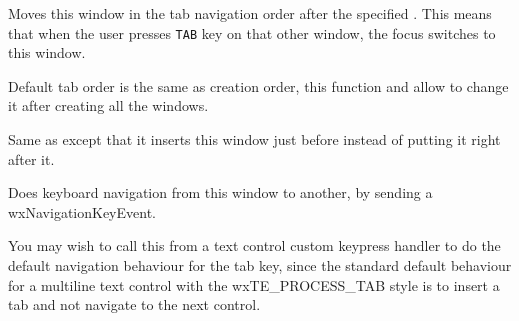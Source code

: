 

\label{wxwindowmoveafterintaborder}


Moves this window in the tab navigation order after the specified .
This means that when the user presses \texttt{TAB} key on that other window,
the focus switches to this window.

Default tab order is the same as creation order, this function and
 allow to change
it after creating all the windows.




\label{wxwindowmovebeforeintaborder}


Same as  except that
it inserts this window just before  instead of putting it right after
it.


\label{wxwindownavigate}


Does keyboard navigation from this window to another, by sending
a wxNavigationKeyEvent.




You may wish to call this from a text control custom keypress handler to do the default
navigation behaviour for the tab key, since the standard default behaviour for
a multiline text control with the wxTE\_PROCESS\_TAB style is to insert a tab
and not navigate to the next control.


